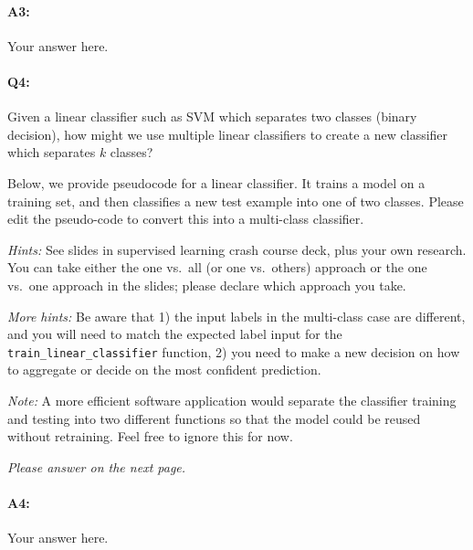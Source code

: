 \paragraph{A3:} Your answer here.










\pagebreak
\paragraph{Q4:} Given a linear classifier such as SVM which separates two classes (binary decision), how might we use multiple linear classifiers to create a new classifier which separates $k$ classes?

Below, we provide pseudocode for a linear classifier. It trains a model on a training set, and then classifies a new test example into one of two classes. Please edit the pseudo-code to convert this into a multi-class classifier. 

\emph{Hints:} See slides in supervised learning crash course deck, plus your own research. You can take either the one vs.~all (or one vs.~others) approach or the one vs.~one approach in the slides; please declare which approach you take.

\emph{More hints:} Be aware that 1) the input labels in the multi-class case are different, and you will need to match the expected label input for the \texttt{train\_linear\_classifier} function, 2) you need to make a new decision on how to aggregate or decide on the most confident prediction.

\emph{Note:} A more efficient software application would separate the classifier training and testing into two different functions so that the model could be reused without retraining. Feel free to ignore this for now.

\emph{Please answer on the next page.}

\pagebreak
\paragraph{A4:} Your answer here.

